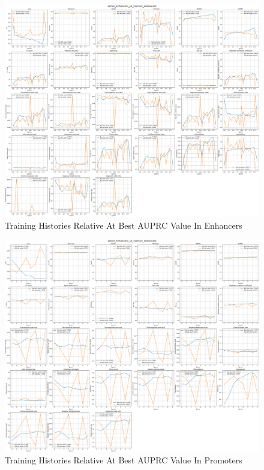\documentclass{article}
\begin{document}
\begin{figure}[!ht]
    \centering
    \includegraphics[width=12cm]{image/train_histories/enhancers.PNG}
    \caption{Training Histories Relative At Best AUPRC Value In Enhancers}
    \label{fig:train_histories_enhancers}
\end{figure}
\begin{figure}[!ht]
    \centering
    \includegraphics[width=12cm]{image/train_histories/promoters.PNG}
    \caption{Training Histories Relative At Best AUPRC Value In Promoters}
    \label{fig:train_histories_promoters}
\end{figure}
\end{document}
